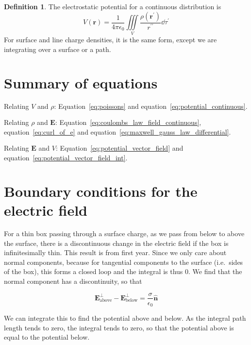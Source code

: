 \documentclass[12pt,chapterprefix=false,dvipsnames]{scrbook}
\theoremstyle{dotless}
\theoremstyle{definition}
\newtheorem{protodefinition}{Definition}[section]
\newenvironment{definition}
{\colorlet{shadecolor}{black!15}\begin{shaded}\begin{protodefinition}}
			{\end{protodefinition}\end{shaded}}
\begin{document}
\begin{definition}
	The electrostatic potential for a continuous distribution is
	\begin{equation}
		\label{eq:potential_continuous}
		V(\bm{r}) =
		\frac{1}{4\pi\epsilon_{0}}\iiint\limits_V\frac{\rho(\bm{r}^\prime)}{r^{\prime\prime}}\dd{\tau^\prime}
	\end{equation}
	For surface and line charge densities, it is the same form,
	except we are integrating over a surface or a path.
\end{definition}

\section{Summary of equations}%
\label{sec:summary_of_equations}

Relating $V$ and $\rho$:
Equation~\ref{eq:poissons} and
equation~\ref{eq:potential_continuous}.

Relating $\rho$ and $\bm{E}$:
Equation~\ref{eq:coulombs_law_field_continuous},
equation~\ref{eq:curl_of_e} and
equation~\ref{eq:maxwell_gauss_law_differential}.

Relating $\bm{E}$ and $V$:
Equation~\ref{eq:potential_vector_field} and
equation~\ref{eq:potential_vector_field_int}.

\section{Boundary conditions for the electric field}%
\label{sec:boundary_conditions_for_the_electric_field}

For a thin box passing through a surface charge, as we pass from
below to above the surface, there is a discontinuous change in
the electric field if the box is infinitesimally thin. This
result is from first year. Since we only care about normal
components, because for tangential components to the surface
(i.e.\ sides of the box), this forms a closed loop and the
integral is thus 0. We find that the normal component has a
discontinuity, so that

\begin{equation}
	\label{eq:thin_box_sheet}
	\bm{E}^\perp_{\mathrm{above}} -
	\bm{E}^\perp_{\mathrm{below}} =
	\frac{\sigma}{\epsilon_{0}}\hat{\bm{n}}
\end{equation}

We can integrate this to find the potential above and below. As
the integral path length tends to zero, the integral tends to
zero, so that the potential above is equal to the potential
below.
\end{document}
